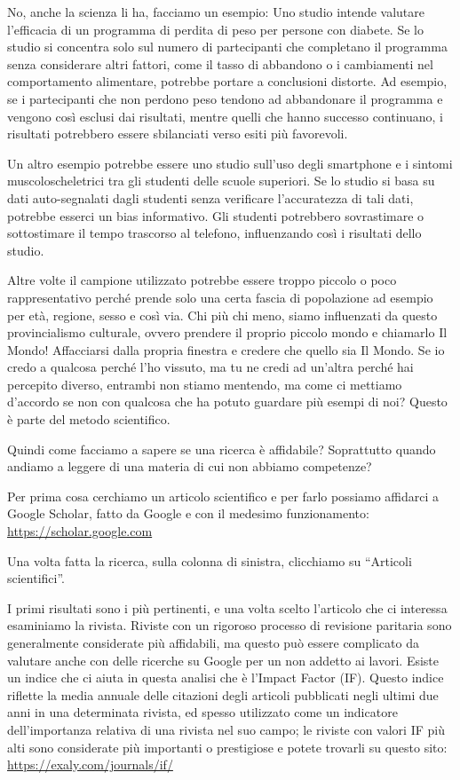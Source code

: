 \documentclass[12pt]{book} %
\begin{document}
No, anche la scienza li ha, facciamo un esempio: Uno studio intende valutare l'efficacia di un
programma di perdita di peso per persone con diabete. Se lo studio si concentra solo sul numero di partecipanti che
completano il programma senza considerare altri fattori, come il tasso di abbandono o i cambiamenti nel comportamento
alimentare, potrebbe portare a conclusioni distorte. Ad esempio, se i partecipanti che non perdono peso tendono ad
abbandonare il programma e vengono così esclusi dai risultati, mentre quelli che hanno successo continuano, i risultati
potrebbero essere sbilanciati verso esiti più favorevoli.

Un altro esempio potrebbe essere uno studio sull'uso degli smartphone e i sintomi
muscoloscheletrici tra gli studenti delle scuole superiori. Se lo studio si basa su dati auto-segnalati dagli studenti
senza verificare l'accuratezza di tali dati, potrebbe esserci un bias informativo. Gli studenti
potrebbero sovrastimare o sottostimare il tempo trascorso al telefono, influenzando così i risultati dello studio.

Altre volte il campione utilizzato potrebbe essere troppo piccolo o poco rappresentativo perché prende solo una certa fascia di popolazione ad esempio per età, regione, sesso e così via. Chi più chi meno, siamo influenzati da questo provincialismo culturale, ovvero prendere il proprio piccolo mondo e chiamarlo Il Mondo! Affacciarsi dalla propria finestra e credere che quello sia Il Mondo. Se io credo a qualcosa perché l'ho vissuto, ma tu ne credi ad un'altra perché hai percepito diverso, entrambi non stiamo mentendo, ma come ci mettiamo d'accordo se non con qualcosa che ha potuto guardare più esempi di noi? Questo è parte del metodo scientifico.

Quindi come facciamo a sapere se una ricerca è affidabile? Soprattutto quando andiamo a leggere di una materia di cui
non abbiamo competenze?

Per prima cosa cerchiamo un articolo scientifico e per farlo possiamo affidarci a Google Scholar, fatto da Google e con
il medesimo funzionamento: \url{https://scholar.google.com}

Una volta fatta la ricerca, sulla colonna di sinistra, clicchiamo su “Articoli scientifici”.

I primi risultati sono i più pertinenti, e una volta scelto l'articolo che ci interessa esaminiamo
la rivista. Riviste con un rigoroso processo di revisione paritaria sono generalmente considerate più affidabili, ma
questo può essere complicato da valutare anche con delle ricerche su Google per un non addetto ai lavori. Esiste un
indice che ci aiuta in questa analisi che è l'Impact Factor (IF). Questo indice riflette la media
annuale delle citazioni degli articoli pubblicati negli ultimi due anni in una determinata rivista, ed spesso
utilizzato come un indicatore dell'importanza relativa di una rivista nel suo campo; le riviste
con valori IF più alti sono considerate più importanti o prestigiose e potete trovarli su questo sito: \url{https://exaly.com/journals/if/}
\end{document}
